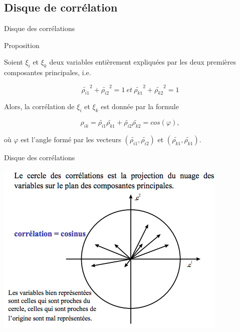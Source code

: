 \documentclass[10pt]{beamer}
\begin{document}
\subsection{Disque de corrélation}
\begin{frame}{Disque des corrélations}

  \begin{block}{Proposition}
  
  
  Soient $\xi_i$ et $\xi_k$ deux variables entièrement expliquées par les deux premières composantes principales, i.e.
  
  $$ \tilde{\rho_{i1}}^2 + \tilde{\rho_{i2}}^2=1 \ et  \  \tilde{\rho_{k1}}^2 + \tilde{\rho_{k2}}^2=1 $$
  
  Alors, la corrélation de $\xi_i$ et $\xi_k$ est donnée par la formule 
  
  $$  {\rho_{ik}}  = \tilde{\rho_{i1}}   \tilde{\rho_{k1}}  +  \tilde{\rho_{i2}}   \tilde{\rho_{k2}}  = cos(\varphi), $$

où $\varphi$ est l'angle formé par les vecteurs $(\tilde{\rho_{i1}}, \tilde{\rho_{i2}})$ et $(\tilde{\rho_{k1}}, \tilde{\rho_{k1}})$.
  
  \end{block}
 

\end{frame}

\begin{frame}{Disque des corrélations}

\centering 

 \includegraphics[scale=0.7]{Correlation.png}


\end{frame}
\end{document}
